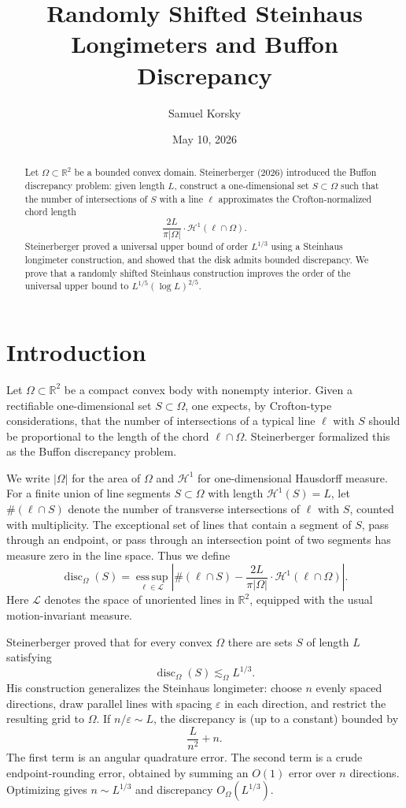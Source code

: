 \documentclass[11pt]{article}
\title{Randomly Shifted Steinhaus Longimeters and Buffon Discrepancy}
\author{Samuel Korsky}
\date{May 10, 2026}
\newcommand{\R}{\mathbb R}
\newcommand{\cH}{\mathcal H}
\newcommand{\cL}{\mathcal L}
\newcommand{\eps}{\varepsilon}
\begin{document}
\maketitle

\begin{abstract}
\noindent
Let $\Omega\subset\R^2$ be a bounded convex domain. Steinerberger (2026) introduced the Buffon discrepancy problem: given length $L$, construct a one-dimensional set $S\subset\Omega$ such that the number of intersections of $S$ with a line $\ell$ approximates the Crofton-normalized chord length
\[
        \frac{2L}{\pi|\Omega|}\cdot\cH^1(\ell\cap\Omega).
\]
Steinerberger proved a universal upper bound of order $L^{1/3}$ using a Steinhaus longimeter construction, and showed that the disk admits bounded discrepancy. We prove that a randomly shifted Steinhaus construction improves the order of the universal upper bound to $L^{1/5}(\log L)^{2/5}$. 
\end{abstract}

\section{Introduction}

Let $\Omega\subset\R^2$ be a compact convex body with nonempty interior. Given a rectifiable one-dimensional set $S\subset\Omega$, one expects, by Crofton-type considerations, that the number of intersections of a typical line $\ell$ with $S$ should be proportional to the length of the chord $\ell\cap\Omega$. Steinerberger \cite{SteinerbergerBuffon} formalized this as the Buffon discrepancy problem.

\bigskip
\noindent
We write $|\Omega|$ for the area of $\Omega$ and $\cH^1$ for one-dimensional Hausdorff measure. For a finite union of line segments $S\subset\Omega$ with length $\cH^1(S) = L$, let $\#(\ell \cap S)$ denote the number of transverse intersections of $\ell$ with $S$, counted with multiplicity. The exceptional set of lines that contain a segment of $S$, pass through an endpoint, or pass through an intersection point of two segments has measure zero in the line space. Thus we define
\[
        \operatorname{disc}_\Omega(S)
        =
        \operatorname*{ess\,sup}_{\ell\in\cL}
        \left|
        \#(\ell \cap S)
        -
        \frac{2L}{\pi|\Omega|}
        \cdot \cH^1(\ell\cap\Omega)
        \right|.
\]
Here $\cL$ denotes the space of unoriented lines in $\R^2$, equipped with the usual motion-invariant measure.

\bigskip
\noindent
Steinerberger proved that for every convex $\Omega$ there are sets $S$ of length $L$ satisfying
\[
        \operatorname{disc}_\Omega(S)\lesssim_\Omega L^{1/3}.
\]
His construction generalizes the Steinhaus longimeter: choose $n$ evenly spaced directions, draw parallel lines with spacing $\eps$ in each direction, and restrict the resulting grid to $\Omega$. If $n/\eps\sim L$, the discrepancy is (up to a constant) bounded by
\[
        \frac{L}{n^2}+n.
\]
The first term is an angular quadrature error. The second term is a crude endpoint-rounding error, obtained by summing an $O(1)$ error over $n$ directions. Optimizing gives $n\sim L^{1/3}$ and discrepancy $O_\Omega(L^{1/3})$.
\end{document}
